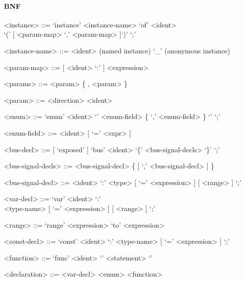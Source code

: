 \documentclass{article}
\begin{document}
\paragraph{BNF}
\begin{grammar}

  <instance> ::= `instance' <instance-name> `of' <ident> \\`(' [ <param-map> { `,' <param-map> } ]`)' `;'


  <instance-name> ::= <ident> (named instance)
  \alt `_' (anonymous instance)

  <param-map> ::= [ <ident> `:' ] <expression>

  <params> ::= <param> \{ , <param> \}

  <param> ::= <direction> <ident>

  <enum> ::= `enum' <ident> `{' <enum-field> \{ `,' <enum-field>  \} `}' `;'

  <enum-field> ::= <ident> [ `=' <expr> ]

  <bus-decl> ::= [ `exposed' ] `bus' <ident> `\{' <bus-signal-decls> `\}'  `;'

  <bus-signal-decls> ::= <bus-signal-decl> \{ [ `,' <bus-signal-decl> ] \}

  <bus-signal-decl> ::= <ident> `:' <type> [ `=' <expression> ] [ <range> ] `;'

  <var-decl> ::= `var' <ident> `:' \\ <type-name> [ `=' <expression> ] [ <range> ] `;'

  <range> ::= `range' <expression> `to' <expression>

  <const-decl> ::= `const' <ident> `:' <type-name> [ `=' <expression> ] `;'

  <function> ::= `func' <ident> `{' { <statement> } `}'

  <declaration> ::= <var-decl>
  \alt <enum>
  \alt <function>

\end{grammar}
\end{document}
